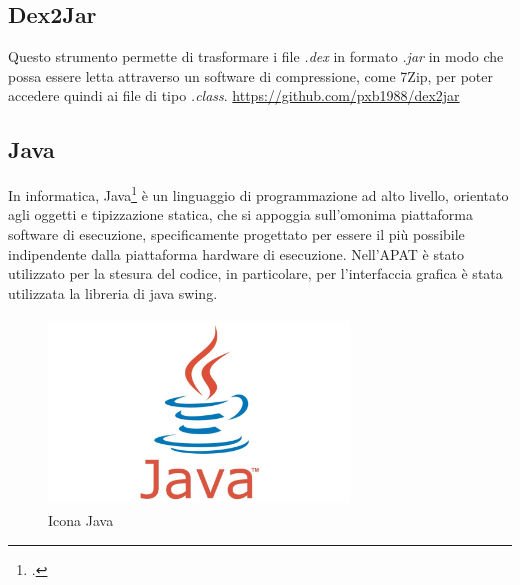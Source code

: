 \subsection*{Dex2Jar}
Questo strumento permette di trasformare i file \textit{.dex} in formato \textit{.jar} in modo che possa essere letta attraverso un software di compressione, come 7Zip, per poter accedere quindi ai file di tipo \textit{.class}.
\url{https://github.com/pxb1988/dex2jar}

\subsection*{Java}
In informatica, Java\footcite{womak:effective-java} è un linguaggio di programmazione ad alto livello, orientato agli oggetti e tipizzazione statica, che si appoggia sull'omonima piattaforma software di esecuzione, specificamente progettato per essere il più possibile indipendente dalla piattaforma hardware di esecuzione.
Nell'APAT è stato utilizzato per la stesura del codice, in particolare, per l'interfaccia grafica è stata utilizzata la libreria di java    \gls{swing}.
\begin{figure}[H]
    \centering
    \includegraphics[width=8cm, height=5cm]{./immagini/java.jpg}
    \caption{Icona Java}\label{fig:java}
\end{figure}

